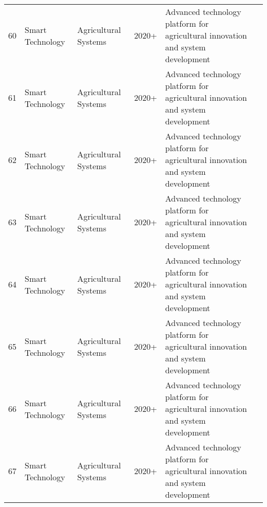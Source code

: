 \begin{table*}[htbp]
\begin{tabular}{p{}p{}p{}p{}p{}p{}}
 60 & Smart Technology & Agricultural Systems & 2020+ & Advanced technology platform for agricultural innovation and system development & \cite{Song2022} \\
 61 & Smart Technology & Agricultural Systems & 2020+ & Advanced technology platform for agricultural innovation and system development & \cite{tu2020passion} \\
 62 & Smart Technology & Agricultural Systems & 2020+ & Advanced technology platform for agricultural innovation and system development & \cite{fu2018kiwifruit} \\
 63 & Smart Technology & Agricultural Systems & 2020+ & Advanced technology platform for agricultural innovation and system development & \cite{mendes2016vine} \\
 64 & Smart Technology & Agricultural Systems & 2020+ & Advanced technology platform for agricultural innovation and system development & \cite{bac2017performance} \\
 65 & Smart Technology & Agricultural Systems & 2020+ & Advanced technology platform for agricultural innovation and system development & \cite{doctor2004optimal} \\
 66 & Smart Technology & Agricultural Systems & 2020+ & Advanced technology platform for agricultural innovation and system development & \cite{bac2016analysis} \\
 67 & Smart Technology & Agricultural Systems & 2020+ & Advanced technology platform for agricultural innovation and system development & \cite{sadeghian2025reliability} \\
\bottomrule
\end{tabular}
\end{table*}